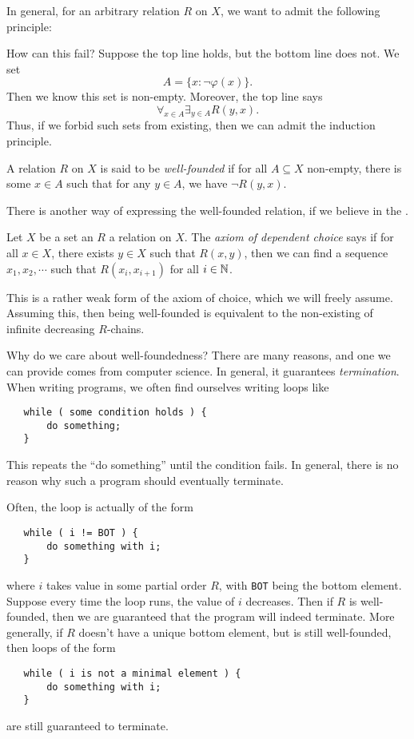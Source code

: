 \documentclass[a4paper]{article}
\begin{document}
In general, for an arbitrary relation $R$ on $X$, we want to admit the following  principle:
\begin{prooftree}
\end{prooftree}
How can this fail? Suppose the top line holds, but the bottom line does not. We set
\[
  A = \{x: \neg \varphi(x)\}.
\]
Then we know this set is non-empty. Moreover, the top line says
\[
  \forall_{x \in A} \exists_{y \in A} R(y, x).
\]
Thus, if we forbid such sets from existing, then we can admit the induction principle.
\begin{defi}
  A relation $R$ on $X$ is said to be \emph{well-founded} if for all $A \subseteq X$ non-empty, there is some $x \in A$ such that for any $y \in A$, we have $\neg R(y, x)$.
\end{defi}

There is another way of expressing the well-founded relation, if we believe in the .
\begin{axiom}
  Let $X$ be a set an $R$ a relation on $X$. The \emph{axiom of dependent choice} says if for all $x \in X$, there exists $y \in X$ such that $R(x, y)$, then we can find a sequence $x_1, x_2, \cdots$ such that $R(x_i, x_{i + 1})$ for all $i \in \N$.
\end{axiom}
This is a rather weak form of the axiom of choice, which we will freely assume. Assuming this, then being well-founded is equivalent to the non-existing of infinite decreasing $R$-chains.

Why do we care about well-foundedness? There are many reasons, and one we can provide comes from computer science. In general, it guarantees \emph{termination}. When writing programs, we often find ourselves writing loops like
\begin{verbatim}
   while ( some condition holds ) {
       do something;
   }
\end{verbatim}
This repeats the ``do something'' until the condition fails. In general, there is no reason why such a program should eventually terminate.

Often, the loop is actually of the form
\begin{verbatim}
   while ( i != BOT ) {
       do something with i;
   }
\end{verbatim}
where $i$ takes value in some partial order $R$, with \texttt{BOT} being the bottom element. Suppose every time the loop runs, the value of $i$ decreases. Then if $R$ is well-founded, then we are guaranteed that the program will indeed terminate. More generally, if $R$ doesn't have a unique bottom element, but is still well-founded, then loops of the form
\begin{verbatim}
   while ( i is not a minimal element ) {
       do something with i;
   }
\end{verbatim}
are still guaranteed to terminate.
\end{document}
